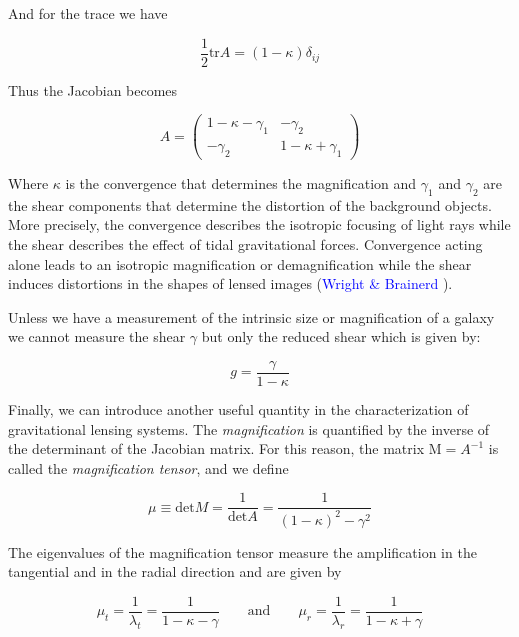 And for the trace we have

\begin{equation}
\frac{1}{2}\text{tr}A=(1-\kappa)\delta_{ij}
\end{equation}

Thus the Jacobian becomes 

\begin{equation}
A= \left(\begin{array}{cc}
1-\kappa-\gamma_{1} & -\gamma_{2}\\
-\gamma_{2} & 1-\kappa+\gamma_{1}
\end{array}\right)
\end{equation}

Where $\kappa$ is the convergence that determines the magnification and $\gamma_{1}$ and $\gamma_{2}$ are the shear components that determine the distortion of the background objects. More precisely, the convergence describes the isotropic focusing of light rays while the shear describes the effect of tidal gravitational forces. Convergence acting alone leads to an isotropic magnification or demagnification while the shear induces distortions in the shapes of lensed images (\textcolor{blue}{Wright \& Brainerd} \citeyear{Reference4}). 

Unless we have a measurement of the intrinsic size or magnification of a galaxy we cannot measure the shear $\gamma$ but only the reduced shear which is given by:

\begin{equation}
g=\frac{\gamma}{1-\kappa}
\end{equation}

Finally, we can introduce another useful quantity in the characterization of gravitational lensing systems. The \textit{magnification} is quantified by the inverse of the determinant of the Jacobian matrix. For this reason, the matrix $\text{M}=A^{-1}$ is called the \textit{magnification tensor}, and we define

\begin{equation}
\mu \equiv \text{det} M = \frac{1}{\text{det}A}=\frac{1}{(1-\kappa)^2-\gamma^2}
\end{equation}

The eigenvalues of the magnification tensor measure the amplification in the tangential and in the radial direction and are given by

\begin{equation}
\mu_t = \frac{1}{\lambda_t}=\frac{1}{1-\kappa - \gamma} \qquad \text{and} \qquad  \mu_r = \frac{1}{\lambda_r}=\frac{1}{1-\kappa + \gamma}
\end{equation}

